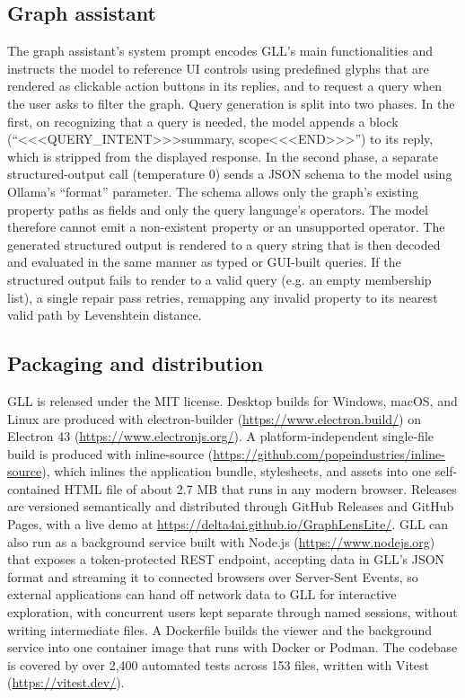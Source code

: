 \subsection{Graph assistant}
The graph assistant's system prompt encodes GLL's main functionalities and instructs the model to reference UI controls using predefined glyphs that are rendered as clickable action buttons in its replies, and to request a query when the user asks to filter the graph. Query generation is split into two phases. In the first, on recognizing that a query is needed, the model appends a block (``<<<QUERY\_INTENT>>>{summary, scope}<<<END>>>'') to its reply, which is stripped from the displayed response. In the second phase, a separate structured-output call (temperature 0) sends a JSON schema to the model using Ollama's ``format'' parameter. The schema allows only the graph's existing property paths as fields and only the query language's operators. The model therefore cannot emit a non-existent property or an unsupported operator. The generated structured output is rendered to a query string that is then decoded and evaluated in the same manner as typed or GUI-built queries. If the structured output fails to render to a valid query (e.g. an empty membership list), a single repair pass retries, remapping any invalid property to its nearest valid path by Levenshtein distance.

\subsection{Packaging and distribution}
GLL is released under the MIT license. Desktop builds for Windows, macOS, and Linux are produced with electron-builder (\url{https://www.electron.build/}) on Electron 43 (\url{https://www.electronjs.org/}). A platform-independent single-file build is produced with inline-source (\url{https://github.com/popeindustries/inline-source}), which inlines the application bundle, stylesheets, and assets into one self-contained HTML file of about 2.7 MB that runs in any modern browser. Releases are versioned semantically and distributed through GitHub Releases and GitHub Pages, with a live demo at  \url{https://delta4ai.github.io/GraphLensLite/}. GLL can also run as a background service built with Node.js (\url{https://www.nodejs.org}) that exposes a token-protected REST endpoint, accepting data in GLL's JSON format and streaming it to connected browsers over Server-Sent Events, so external applications can hand off network data to GLL for interactive exploration, with concurrent users kept separate through named sessions, without writing intermediate files. A Dockerfile builds the viewer and the background service into one container image that runs with Docker or Podman. The codebase is covered by over 2,400 automated tests across 153 files, written with Vitest (\url{https://vitest.dev/}).

